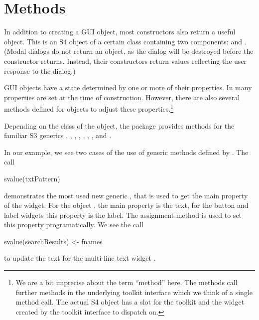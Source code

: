 
\section{Methods}


In addition to creating a GUI object, most 
constructors also return a useful \R\/ object. This is an S4 object of
a certain class containing two components:  and
. (Modal dialogs do not return an object, as the dialog
will be destroyed before the constructor returns. Instead, their
constructors return values reflecting the user response to the
dialog.)


GUI objects have a state determined by one or more of their
properties. In  many properties are set at the time of
construction. However, there are also several methods defined
for  objects to adjust these properties.\footnote{ We
  are a bit imprecise about the term ``method'' here. The
   methods call further methods in the underlying
  toolkit interface which we think of a single method call. The actual
  S4 object has a slot for the toolkit and the widget created by the
  toolkit interface to dispatch on.  }

Depending on the class of the object, the  package
provides methods for the familiar S3 generics \generic{[},
\generic{[$<$-}, , , ,
, ,  and
.


In our example, we see two cases of the use of generic methods defined
by . The call
\begin{Schunk}
\begin{Sinput}
 svalue(txtPattern)
\end{Sinput}
\end{Schunk}
%
demonstrates the most used new generic  ,
that is used to get the main property of the widget. For the object
, the main property is the text, for the button and
label widgets this property is the label. The 
assignment method is used to set this property programatically. We see
the call
\begin{Schunk}
\begin{Sinput}
 svalue(searchResults) <- fnames
\end{Sinput}
\end{Schunk}
to update the text for the multi-line text widget .

